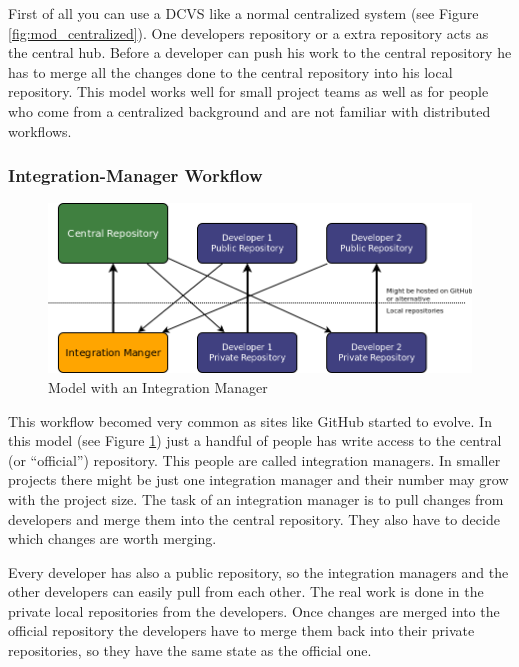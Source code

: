 First of all you can use a DCVS like a normal centralized system (see Figure \ref{fig:mod_centralized}). One developers repository or a extra repository acts as the central hub. Before a developer can push his work to the central repository he has to merge all the changes done to the central repository into his local repository. This model works well for small project teams as well as for people who come from a centralized background and are not familiar with distributed workflows.


\subsubsection{Integration-Manager Workflow}

\begin{figure}[tbp]
  \centering
  \includegraphics[width=\textwidth]{img/Mod_IntegrationManager}
  \caption{Model with an Integration Manager}
  \label{fig:mod_intMan} 
\end{figure}

This workflow becomed very common as sites like GitHub started to evolve. In
this model (see Figure \ref{fig:mod_intMan}) just a handful of people has write access to the central (or “official”) repository. 
This people are called integration managers. In smaller projects there might be just one integration manager and their 
number may grow with the project size. The task of an integration manager is to pull changes from developers and merge 
them into the central repository. They also have to decide which changes are worth merging.

Every developer has also a public repository, so the integration managers and the other developers can easily pull from 
each other. The real work is done in the private local repositories from the developers. Once changes are merged into the 
official repository the developers have to merge them back into their private repositories, so they have the same state as the official one.

